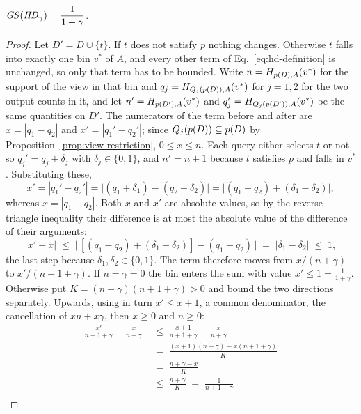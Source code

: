 \begin{proposition}
\label{prop:hd-sensitivity}
$\mathit{GS}(\mathit{HD}_\gamma)=\dfrac{1}{1+\gamma}$.
\end{proposition}

\begin{proof}
Let $D'=D\cup\{t\}$.
If $t$ does not satisfy $p$ nothing changes.
Otherwise $t$ falls into exactly one bin $v^*$ of $A$, and every other term of Eq.~\eqref{eq:hd-definition} is unchanged, so only that term has to be bounded.
Write $n=H_{p(D),A}(v^*)$ for the support of the view in that bin and $q_j=H_{Q_j(p(D)),A}(v^*)$ for $j=1,2$ for the two output counts in it, and let $n'=H_{p(D'),A}(v^*)$ and $q_j'=H_{Q_j(p(D')),A}(v^*)$ be the same quantities on $D'$.
The numerators of the term before and after are $x=|q_1-q_2|$ and $x'=|q_1'-q_2'|$; since $Q_j(p(D))\subseteq p(D)$ by Proposition~\ref{prop:view-restriction}, $0\le x\le n$.
Each query either selects $t$ or not, so $q_j'=q_j+\delta_j$ with $\delta_j\in\{0,1\}$, and $n'=n+1$ because $t$ satisfies $p$ and falls in $v^*$.
Substituting these,
\[
x'=|q_1'-q_2'|=\big|(q_1+\delta_1)-(q_2+\delta_2)\big|=\big|(q_1-q_2)+(\delta_1-\delta_2)\big| ,
\]
whereas $x=|q_1-q_2|$.
Both $x$ and $x'$ are absolute values, so by the reverse triangle inequality their difference is at most the absolute value of the difference of their arguments:
\[
|x'-x|\;\le\;\big|\,[(q_1-q_2)+(\delta_1-\delta_2)]-(q_1-q_2)\,\big|\;=\;|\delta_1-\delta_2|\;\le\;1 ,
\]
the last step because $\delta_1,\delta_2\in\{0,1\}$.
The term therefore moves from $x/(n+\gamma)$ to $x'/(n+1+\gamma)$.
If $n=\gamma=0$ the bin enters the sum with value $x'\le1=\frac{1}{1+\gamma}$.
Otherwise put $K=(n+\gamma)(n+1+\gamma)>0$ and bound the two directions separately.
Upwards, using in turn $x'\le x+1$, a common denominator, the cancellation of $xn+x\gamma$, then $x\ge0$ and $n\ge0$:
\begin{align*}
\frac{x'}{n+1+\gamma}-\frac{x}{n+\gamma}
&\;\le\;\frac{x+1}{n+1+\gamma}-\frac{x}{n+\gamma}\\[2pt]
&\;=\;\frac{(x+1)(n+\gamma)-x(n+1+\gamma)}{K}\\[2pt]
&\;=\;\frac{n+\gamma-x}{K}\\[2pt]
&\;\le\;\frac{n+\gamma}{K}\;=\;\frac{1}{n+1+\gamma}\\[2pt]

\end{align*}
\end{proof}
